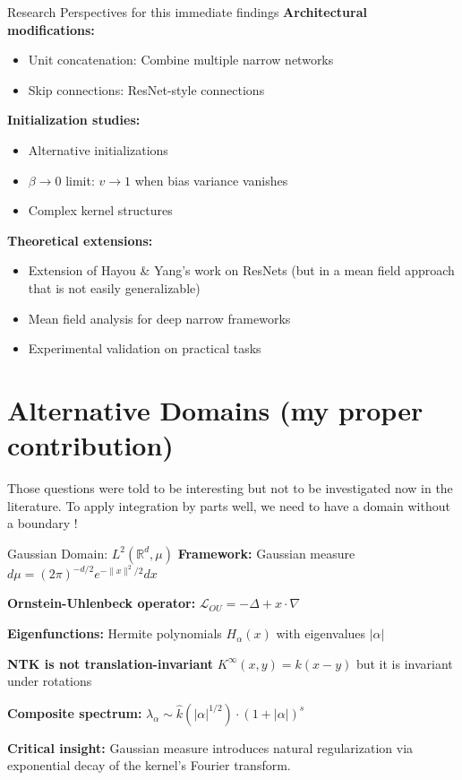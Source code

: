 \documentclass{beamer}
\begin{document}
\begin{frame}{Research Perspectives for this immediate findings}
\textbf{Architectural modifications:}
\begin{itemize}
\item Unit concatenation: Combine multiple narrow networks
\item Skip connections: ResNet-style connections
\end{itemize}

\textbf{Initialization studies:}
\begin{itemize}
\item Alternative initializations
\item $\beta \to 0$ limit: $v \to 1$ when bias variance vanishes
\item Complex kernel structures
\end{itemize}

\textbf{Theoretical extensions:}
\begin{itemize}
\item Extension of Hayou \& Yang's work on ResNets (but in a mean field approach that is not easily generalizable)
\item Mean field analysis for deep narrow frameworks
\item Experimental validation on practical tasks
\end{itemize}
\end{frame}



\section{Alternative Domains (my proper contribution)}

Those questions were told to be interesting but not to be investigated now in the literature.
To apply integration by parts well, we need to have a domain without a boundary !



\begin{frame}{Gaussian Domain: $L^2(\mathbb{R}^d, \mu)$}
\textbf{Framework:} Gaussian measure $d\mu = (2\pi)^{-d/2} e^{-\|x\|^2/2} dx$

\textbf{Ornstein-Uhlenbeck operator:} $\mathcal{L}_{OU} = -\Delta + x \cdot \nabla$

\textbf{Eigenfunctions:} Hermite polynomials $H_{\alpha}(x)$ with eigenvalues $|\alpha|$

\textbf{NTK is not translation-invariant} $K^{\infty}(x, y) = k(x - y)$ but it is invariant under rotations

\textbf{Composite spectrum:} $\lambda_\alpha \sim \hat{k}(|\alpha|^{1/2}) \cdot (1 + |\alpha|)^s$

\textbf{Critical insight:} Gaussian measure introduces natural regularization via exponential decay of the kernel's Fourier transform.
\end{frame}
\end{document}
